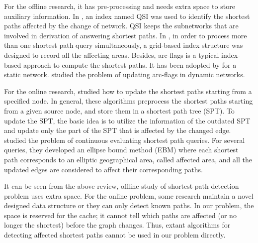 For the offline research, it has pre-processing and needs extra space to store auxiliary information.
In \cite{tian2009monitoring}, an index named QSI was used to identify the shortest paths affected by the change of network. 
QSI keeps the subnetworks that are involved in derivation of answering shortest paths. 
In \cite{lee2007}, in order to process more than one shortest path query simultaneously, a grid-based index structure was designed to record all the affecting areas.
Besides, arc-flags is a typical index-based approach to compute the shortest paths. It has been adopted by \cite{lauther2004extremely} for a static network. \cite{berrettini2009arc,d2014fully} studied the problem of updating arc-flags in dynamic networks.

For the online research, \cite{bauer2009batch,d2013dynamically,frigioni1996fully,narvaez2000new,mcquillan1980new} studied how to update the shortest paths starting from a specified node.
In general, these algorithms preprocess the shortest paths starting from a given source node, and store them in a shortest path tree (SPT). To update the SPT, the basic idea is to utilize the information of the outdated SPT and update only the part of the SPT that is affected by the changed edge.
\cite{lee2007} studied the problem of continuous evaluating shortest path queries. For several queries, they developed an ellipse bound method (EBM) where each shortest path corresponds to an elliptic geographical area, called affected area, and all the updated edges are considered to affect their corresponding paths.

It can be seen from the above review, offline study of shortest path detection problem uses extra space. For the online problem, some research maintain a novel designed data structure or they can only detect known paths. In our problem, the space is reserved for the cache; it cannot tell which paths are affected (or no longer the shortest) before the graph changes. Thus, extant algorithms for detecting affected shortest paths cannot be used in our problem directly.


